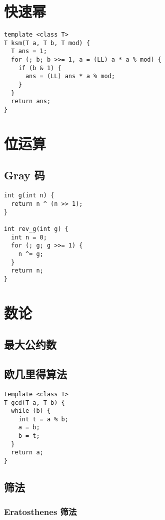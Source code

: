 \documentclass[a4paper,11pt,twoside,fontset = fandol,UTF8]{ctexbook} %
\begin{document}
\section{快速幂}

\begin{lstlisting}
template <class T>
T ksm(T a, T b, T mod) {
  T ans = 1;
  for (; b; b >>= 1, a = (LL) a * a % mod) {
    if (b & 1) {
      ans = (LL) ans * a % mod;
    }
  }
  return ans;
}
\end{lstlisting}

\section{位运算}

\subsection{Gray 码}

\begin{lstlisting}
int g(int n) {
  return n ^ (n >> 1);
}

int rev_g(int g) {
  int n = 0;
  for (; g; g >>= 1) {
    n ^= g;
  }
  return n;
}
\end{lstlisting}

\section{数论}

\subsection{最大公约数}

\subsection{欧几里得算法}

\begin{lstlisting}
template <class T>
T gcd(T a, T b) {
  while (b) {
    int t = a % b;
    a = b;
    b = t;
  }
  return a;
}
\end{lstlisting}

\subsection{筛法}

\subsubsection{Eratosthenes 筛法}
\end{document}
